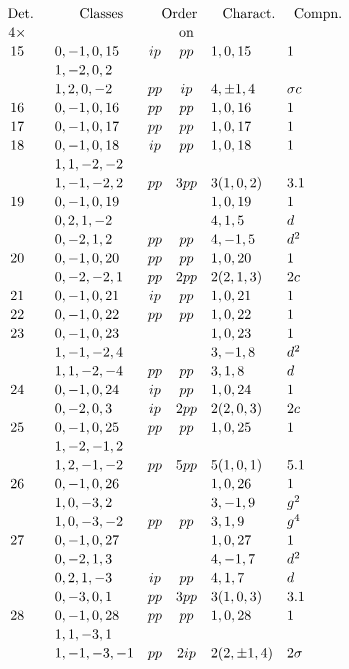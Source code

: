 ﻿\documentclass[11pt,a4paper]{article}
\theoremstyle{plain}
\theoremstyle{definition}
\begin{document}
\[
\renewcommand{\arraystretch}{1.12}
\begin{array}{c@{\quad}r@{\quad}l@{\quad}c@{\quad}c@{\quad}l@{\quad}l}
\multicolumn{1}{c}{\text{Det.}}&&
\multicolumn{1}{c}{\text{Classes}}&
\multicolumn{2}{c}{\text{Order}}&
\multicolumn{1}{c}{\text{Charact.}}&
\multicolumn{1}{c}{\text{Compn.}}\\
4\times&&& &\text{on}&&\\
15&&0,-1,0,15&ip&pp&1,0,15&1\\
&&1,-2,0,2&&&&\\
&&1,2,0,-2&pp&ip&4,\pm1,4&\sigma c\\
16&&0,-1,0,16&pp&pp&1,0,16&1\\
17&&0,-1,0,17&pp&pp&1,0,17&1\\
18&&0,-1,0,18&ip&pp&1,0,18&1\\
&&1,1,-2,-2&&&&\\
&&1,-1,-2,2&pp&3pp&3(1,0,2)&3.1\\
19&&0,-1,0,19&&&1,0,19&1\\
&&0,2,1,-2&&&4,1,5&d\\
&&0,-2,1,2&pp&pp&4,-1,5&d^2\\
20&&0,-1,0,20&pp&pp&1,0,20&1\\
&&0,-2,-2,1&pp&2pp&2(2,1,3)&2c\\
21&&0,-1,0,21&ip&pp&1,0,21&1\\
22&&0,-1,0,22&pp&pp&1,0,22&1\\
23&&0,-1,0,23&&&1,0,23&1\\
&&1,-1,-2,4&&&3,-1,8&d^2\\
&&1,1,-2,-4&pp&pp&3,1,8&d\\
24&&0,-1,0,24&ip&pp&1,0,24&1\\
&&0,-2,0,3&ip&2pp&2(2,0,3)&2c\\
25&&0,-1,0,25&pp&pp&1,0,25&1\\
&&1,-2,-1,2&&&&\\
&&1,2,-1,-2&pp&5pp&5(1,0,1)&5.1\\
26&&0,-1,0,26&&&1,0,26&1\\
&&1,0,-3,2&&&3,-1,9&g^2\\
&&1,0,-3,-2&pp&pp&3,1,9&g^4\\
27&&0,-1,0,27&&&1,0,27&1\\
&&0,-2,1,3&&&4,-1,7&d^2\\
&&0,2,1,-3&ip&pp&4,1,7&d\\
&&0,-3,0,1&pp&3pp&3(1,0,3)&3.1\\
28&&0,-1,0,28&pp&pp&1,0,28&1\\
&&1,1,-3,1&&&&\\
&&1,-1,-3,-1&pp&2ip&2(2,\pm1,4)&2\sigma
\end{array}
\]
\scriptsize
\setlength{\tabcolsep}{4pt}
\end{document}
